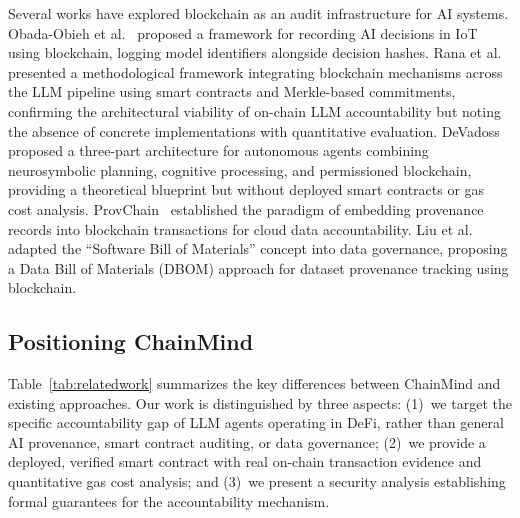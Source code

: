 \documentclass[manuscript,nonacm]{acmart}
\begin{document}
Several works have explored blockchain as an audit infrastructure for AI systems.
Obada-Obieh et al.~\cite{ai_iot_blockchain} proposed a framework for recording AI decisions in IoT using blockchain, logging model identifiers alongside decision hashes.
Rana et al.~\cite{blockchain_llm_review} presented a methodological framework integrating blockchain mechanisms across the LLM pipeline using smart contracts and Merkle-based commitments, confirming the architectural viability of on-chain LLM accountability but noting the absence of concrete implementations with quantitative evaluation.
DeVadoss~\cite{devadoss2026permissioned} proposed a three-part architecture for autonomous agents combining neurosymbolic planning, cognitive processing, and permissioned blockchain, providing a theoretical blueprint but without deployed smart contracts or gas cost analysis.
ProvChain~\cite{provchain2017} established the paradigm of embedding provenance records into blockchain transactions for cloud data accountability.
Liu et al.~\cite{dbom2024} adapted the ``Software Bill of Materials'' concept into data governance, proposing a Data Bill of Materials (DBOM) approach for dataset provenance tracking using blockchain.

\subsection{Positioning ChainMind}

Table~\ref{tab:relatedwork} summarizes the key differences between ChainMind and existing approaches.
Our work is distinguished by three aspects: (1)~we target the specific accountability gap of LLM agents operating in DeFi, rather than general AI provenance, smart contract auditing, or data governance; (2)~we provide a deployed, verified smart contract with real on-chain transaction evidence and quantitative gas cost analysis; and (3)~we present a security analysis establishing formal guarantees for the accountability mechanism.
\end{document}
